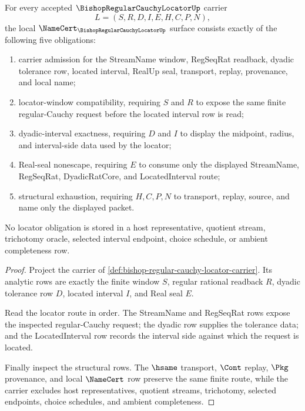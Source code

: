 \begin{theorem}
\label{thm:bishop-regular-cauchy-locator-namecert-obligations}
For every accepted $\BishopRegularCauchyLocatorUp$ carrier
$$
L=(S,R,D,I,E,H,C,P,N),
$$
the local $\NameCert_{\BishopRegularCauchyLocatorUp}$ surface consists exactly of the following five obligations:
\begin{enumerate}
\item carrier admission for the StreamName window, RegSeqRat readback, dyadic tolerance row, located interval, RealUp seal, transport, replay, provenance, and local name;
\item locator-window compatibility, requiring $S$ and $R$ to expose the same finite regular-Cauchy request before the located interval row is read;
\item dyadic-interval exactness, requiring $D$ and $I$ to display the midpoint, radius, and interval-side data used by the locator;
\item Real-seal nonescape, requiring $E$ to consume only the displayed StreamName, RegSeqRat, DyadicRatCore, and LocatedInterval route;
\item structural exhaustion, requiring $H,C,P,N$ to transport, replay, source, and name only the displayed packet.
\end{enumerate}
No locator obligation is stored in a host representative, quotient stream, trichotomy oracle, selected interval endpoint, choice schedule, or ambient completeness row.
\end{theorem}
\begin{proof}
Project the carrier of \autoref{def:bishop-regular-cauchy-locator-carrier}. Its analytic rows are exactly the finite window $S$, regular rational readback $R$, dyadic tolerance row $D$, located interval $I$, and Real seal $E$.

Read the locator route in order. The StreamName and RegSeqRat rows expose the inspected regular-Cauchy request; the dyadic row supplies the tolerance data; and the LocatedInterval row records the interval side against which the request is located.

Finally inspect the structural rows. The $\hsame$ transport, $\Cont$ replay, $\Pkg$ provenance, and local $\NameCert$ row preserve the same finite route, while the carrier excludes host representatives, quotient streams, trichotomy, selected endpoints, choice schedules, and ambient completeness.
\end{proof}

